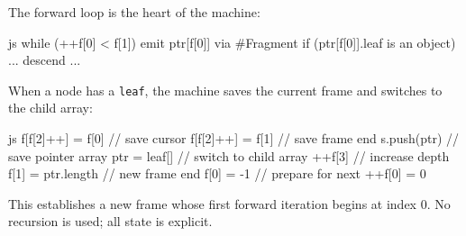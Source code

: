 \begin{NxLightBox}[title={Phase 2 -- Forward Scan}]
	\begin{NxLightP}
		The forward loop is the heart of the machine:
	\end{NxLightP}

	\begin{NxCodeBox}{js}{}
while (++f[0] < f[1]) {
	emit ptr[f[0]] via #Fragment
	if (ptr[f[0]].leaf is an object) { ... descend ... }
}
	\end{NxCodeBox}

	\begin{NxLightList}
	\end{NxLightList}
\end{NxLightBox}

\begin{NxLightBox}[title={Phase 3 -- Descent}]
	\begin{NxLightP}
		When a node has a \texttt{leaf}, the machine saves the current frame and switches to the child array:
	\end{NxLightP}

	\begin{NxCodeBox}{js}{}
f[f[2]++] = f[0]	 // save cursor
f[f[2]++] = f[1]	 // save frame end
s.push(ptr)		  // save pointer array
ptr = leaf[]		 // switch to child array
++f[3]			   // increase depth
f[1] = ptr.length	// new frame end
f[0] = -1			// prepare for next ++f[0] = 0
	\end{NxCodeBox}

	\begin{NxLightP}
		This establishes a new frame whose first forward iteration begins at index 0. No recursion is used; all state is explicit.
	\end{NxLightP}
\end{NxLightBox}

